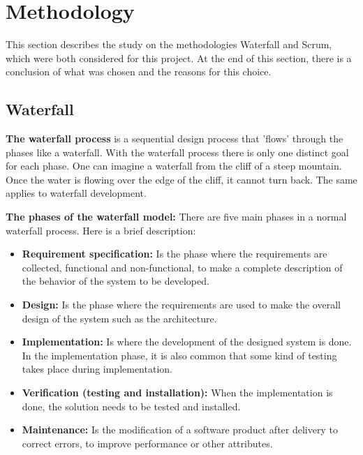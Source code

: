 \section{Methodology}
\label{sec:premethodology}

This section describes the study on the methodologies Waterfall and Scrum, which were both considered 
for this project. At the end of this section, there is a conclusion of what was chosen and the reasons for this choice.

\subsection{Waterfall}

{\bf The waterfall process } is a sequential design process that 'flows' through the phases like a waterfall.
With the waterfall process there is only one distinct goal for each phase. One can imagine a waterfall from the cliff of a steep mountain. Once the water is flowing over the edge of the cliff, it cannot turn back. The same applies to waterfall development. \cite{wikiWaterfall, techtargetWaterfall}

{\bf The phases of the waterfall model:} There are five main phases in a normal waterfall process. 
Here is a brief description:
\begin{itemize}
	\item {\bf Requirement specification:} Is the phase where the requirements are collected, functional and non-functional, to make a complete description of the behavior of the system to be developed.
	\item {\bf Design: } Is the phase where the requirements are used to make the overall design of the system such as the
	architecture.
	\item {\bf Implementation:} Is where the development of the designed system is done. In the implementation phase, 
	it is also common that some kind of testing takes place during implementation.
	\item {\bf Verification (testing and installation): } When the implementation is done, the solution needs to be tested and installed.
	\item {\bf Maintenance:} Is the modification of a software product after delivery to correct errors, to improve performance or other attributes.
\end{itemize}


